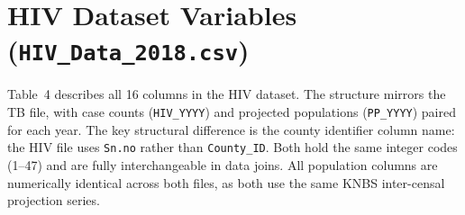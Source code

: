 \documentclass[11pt,a4paper]{article}
\newcommand{\code}[1]{\texttt{\small #1}}
\begin{document}
\section{HIV Dataset Variables (\texttt{HIV\_Data\_2018.csv})}

Table~4 describes all 16 columns in the HIV dataset. The structure mirrors the
TB file, with case counts (\code{HIV\_YYYY}) and projected populations
(\code{PP\_YYYY}) paired for each year. The key structural difference is the
county identifier column name: the HIV file uses \code{Sn.no} rather than
\code{County\_ID}. Both hold the same integer codes (1--47) and are fully
interchangeable in data joins. All population columns are numerically identical
across both files, as both use the same KNBS inter-censal projection series.
\end{document}
